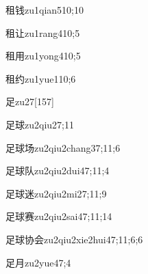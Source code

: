 \begin{verbete}{租钱}{zu1qian5}{10;10}
\end{verbete}

\begin{verbete}{租让}{zu1rang4}{10;5}
\end{verbete}

\begin{verbete}{租用}{zu1yong4}{10;5}
\end{verbete}

\begin{verbete}{租约}{zu1yue1}{10;6}
\end{verbete}

\begin{verbete}{足}{zu2}{7}[157]
\end{verbete}

\begin{verbete}{足球}{zu2qiu2}{7;11}
\end{verbete}

\begin{verbete}{足球场}{zu2qiu2chang3}{7;11;6}
\end{verbete}

\begin{verbete}{足球队}{zu2qiu2dui4}{7;11;4}
\end{verbete}

\begin{verbete}{足球迷}{zu2qiu2mi2}{7;11;9}
\end{verbete}

\begin{verbete}{足球赛}{zu2qiu2sai4}{7;11;14}
\end{verbete}

\begin{verbete}{足球协会}{zu2qiu2xie2hui4}{7;11;6;6}
\end{verbete}

\begin{verbete}{足月}{zu2yue4}{7;4}
\end{verbete}


